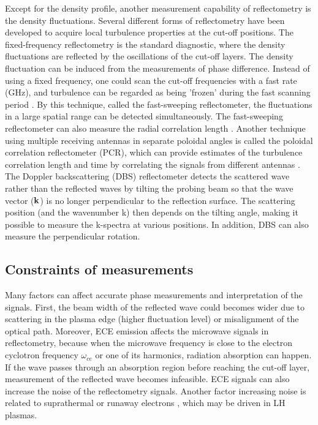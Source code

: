 Except for the density profile, another measurement capability of reflectometry is the density fluctuations. Several different forms of reflectometry have been developed to acquire local turbulence properties at the cut-off positions. The fixed-frequency reflectometry is the standard diagnostic, where the density fluctuations are reflected by the oscillations of the cut-off layers. The density fluctuation can be induced from the measurements of phase difference. Instead of using a fixed frequency, one could scan the cut-off frequencies with a fast rate (GHz), and turbulence can be regarded as being 'frozen' during the fast scanning period \cite{Clairet_2010_RSI}. By this technique, called the fast-sweeping reflectometer, the fluctuations in a large spatial range can be detected simultaneously. The fast-sweeping reflectometer can also measure the radial correlation length \cite{Hornung_2013_PPCF}. Another technique using multiple receiving antennas in separate poloidal angles is called the poloidal correlation reflectometer (PCR), which can provide estimates of the turbulence correlation length and time by correlating the signals from different antennas \cite{Kramer_RSI_2010_reflectometry}. The Doppler backscattering (DBS) reflectometer detects the scattered wave rather than the reflected waves by tilting the probing beam so that the wave vector ($\boldsymbol{\mathrm{k}}$) is no longer perpendicular to the reflection surface. The scattering position (and the wavenumber k) then depends on the tilting angle, making it possible to measure the k-spectra at various positions. In addition, DBS can also measure the perpendicular rotation.



\subsection{Constraints of measurements} \label{constraints_of_measurements}


Many factors can affect accurate phase measurements and interpretation of the signals. First, the beam width of the reflected wave could becomes wider due to scattering in the plasma edge (higher fluctuation level) or misalignment of the optical path. Moreover, ECE emission affects the microwave signals in reflectometry, because when the microwave frequency is close to the electron cyclotron frequency $\omega_{ce}$ or one of its harmonics, radiation absorption can happen. If the wave passes through an absorption region before reaching the cut-off layer, measurement of the reflected wave becomes infeasible. ECE signals can also increase the noise of the reflectometry signals. Another factor increasing noise is related to suprathermal or runaway electrons \cite{Sabot_2006_PPCF}, which may be driven in LH plasmas.




